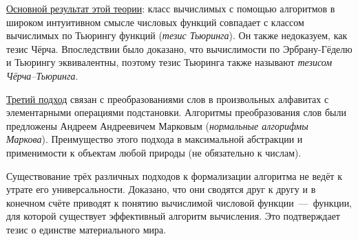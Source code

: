 \underline{Основной результат этой теории}: класс вычислимых с помощью алгоритмов в широком интуитивном смысле числовых функций совпадает с классом вычислимых по Тьюрингу функций (\textit{тезис Тьюринга}). Он также недоказуем, как тезис Чёрча. Впоследствии было доказано, что вычислимости по Эрбрану-Гёделю и Тьюрингу эквивалентны, поэтому тезис Тьюринга также называют \textit{тезисом Чёрча--Тьюринга}.

\underline{Третий подход} связан с преобразованиями слов в произвольных алфавитах с элементарными операциями подстановки. Алгоритмы преобразования слов были предложены Андреем Андреевичем Марковым (\textit{нормальные алгорифмы Маркова}). Преимущество этого подхода в максимальной абстракции и применимости к объектам любой природы (не обязательно к числам).

Существование трёх различных подходов к формализации алгоритма не ведёт к утрате его универсальности. Доказано, что они сводятся друг к другу и в конечном счёте приводят к понятию вычислимой числовой функции~---~функции, для которой существует эффективный алгоритм вычисления. Это подтверждает тезис о единстве материального мира.
